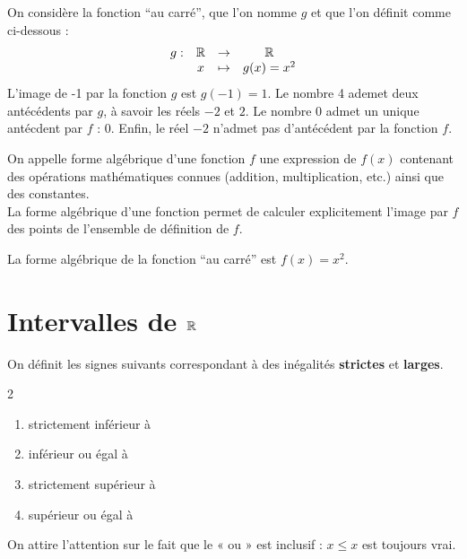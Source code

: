 \documentclass[a4paper, 12pt]{report}
\begin{document}
\begin{ex}
On considère la fonction ``au carré'', que l'on nomme $g$ et que l'on définit comme ci-dessous :
\[ \begin{array}{c c c c}
	g : & \mathbb{R} & \to & \mathbb{R} \\
	& x & \mapsto & g(x)=x^2
\end{array} \]
L'image de -1 par la fonction $g$ est $g(-1)=1$. Le nombre 4 ademet deux antécédents par $g$, à savoir les réels $-2$ et $2$.
Le nombre 0 admet un unique antécdent par $f$ : 0. Enfin, le réel $-2$ n'admet pas d'antécédent par la fonction $f$.
\end{ex}

\begin{defn}
On appelle forme algébrique d'une fonction $f$ une expression de $f(x)$ contenant des opérations mathématiques connues 
(addition, multiplication, etc.) ainsi que des constantes. \\
La forme algébrique d'une fonction permet de calculer explicitement l'image par $f$ des points de l'ensemble de définition de $f$.
\end{defn}

\begin{ex}
La forme algébrique de la fonction ``au carré'' est $f(x)=x^2$.
\end{ex}

\section{Intervalles de $\mathbb{R}$}

\begin{nota}
	On définit les signes suivants correspondant à des inégalités \textbf{strictes} et \textbf{larges}.
	\begin{multicols}{2}
	\begin{enumerate}[leftmargin=50pt]
		\item[$<$ :] strictement inférieur à
		\item[$\leq$ :] inférieur ou égal à
		\item[$>$ :] strictement supérieur à
		\item[$\geq$ :] supérieur ou égal à
	\end{enumerate}
	\end{multicols}
	On attire l'attention sur le fait que le « ou » est inclusif : $x \leq x$ est toujours vrai. 
\end{nota}
\end{document}
